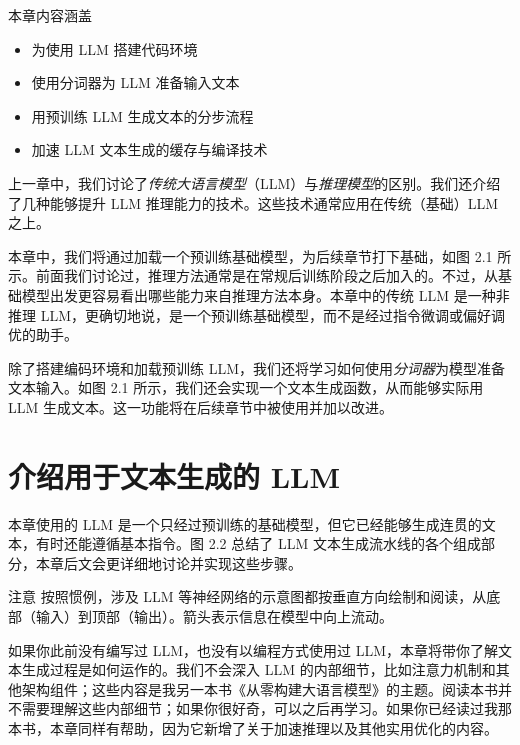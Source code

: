 \begin{myChapterIntro}{本章内容涵盖}
\begin{itemize}
\item 为使用 LLM 搭建代码环境
\item 使用分词器为 LLM 准备输入文本
\item 用预训练 LLM 生成文本的分步流程
\item 加速 LLM 文本生成的缓存与编译技术
\end{itemize}
\end{myChapterIntro}

上一章中，我们讨论了\emph{传统大语言模型}（LLM）与\emph{推理模型}的区别。我们还介绍了几种能够提升 LLM 推理能力的技术。这些技术通常应用在传统（基础）LLM 之上。

本章中，我们将通过加载一个预训练基础模型，为后续章节打下基础，如图 2.1 所示。前面我们讨论过，推理方法通常是在常规后训练阶段之后加入的。不过，从基础模型出发更容易看出哪些能力来自推理方法本身。本章中的传统 LLM 是一种非推理 LLM，更确切地说，是一个预训练基础模型，而不是经过指令微调或偏好调优的助手。


除了搭建编码环境和加载预训练 LLM，我们还将学习如何使用\emph{分词器}为模型准备文本输入。如图 2.1 所示，我们还会实现一个文本生成函数，从而能够实际用 LLM 生成文本。这一功能将在后续章节中被使用并加以改进。

\section{介绍用于文本生成的 LLM}

本章使用的 LLM 是一个只经过预训练的基础模型，但它已经能够生成连贯的文本，有时还能遵循基本指令。图 2.2 总结了 LLM 文本生成流水线的各个组成部分，本章后文会更详细地讨论并实现这些步骤。


\begin{myWarning}{注意}
 按照惯例，涉及 LLM 等神经网络的示意图都按垂直方向绘制和阅读，从底部（输入）到顶部（输出）。箭头表示信息在模型中向上流动。\end{myWarning}

如果你此前没有编写过 LLM，也没有以编程方式使用过 LLM，本章将带你了解文本生成过程是如何运作的。我们不会深入 LLM 的内部细节，比如注意力机制和其他架构组件；这些内容是我另一本书《从零构建大语言模型》的主题。阅读本书并不需要理解这些内部细节；如果你很好奇，可以之后再学习。如果你已经读过我那本书，本章同样有帮助，因为它新增了关于加速推理以及其他实用优化的内容。

